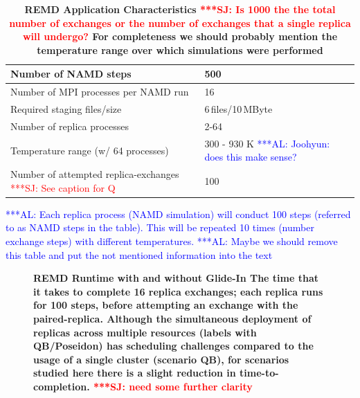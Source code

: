 \documentclass{rspublic}
\newcommand{\alnote}[1]{ {\textcolor{blue} { ***AL: #1 }}}
\newcommand{\jhanote}[1]{ {\textcolor{red} { ***SJ: #1 }}}
\newcommand{\alnote}[1]{}
\newcommand{\jhanote}[1]{}
\newcommand{\glidein}[1]{Glide-In }
\begin{document}
\begin{table}
    \centering
	\begin{tabular}{|p{5cm}|l|}
          \hline
          Number of NAMD steps &500\\ \hline 
          Number of MPI processes per NAMD run &16\\ \hline 
          Required staging files/size &6\,files/10\,MByte\\ \hline
          Number of replica processes &2-64 \\ \hline   
          Temperature range (w/ 64 processes) &300 - 930 K \alnote{Joohyun: does this make sense?} \\ \hline
          Number of attempted replica-exchanges \jhanote{See caption for Q} &100\\ \hline
	\end{tabular}
	\caption{\footnotesize \bf REMD Application Characteristics\label{tab:app_stats}
          \jhanote{Is 1000 the the total number of exchanges or the
            number of exchanges that a single replica will undergo?}
          For completeness we should probably mention the temperature
          range over which simulations were performed}
          \alnote{Each replica process (NAMD simulation) will conduct 
          100 steps (referred to as NAMD steps in the table). This 
          will be repeated 10 times (number exchange steps) with 
          different temperatures.}         
          \alnote{Maybe we should remove this table and put the not mentioned information 
          into the text}
          
\end{table}  
 
\begin{figure}[ht]
    \centering
    \hspace*{-20pt}
        \caption{\footnotesize \bf REMD Runtime with and without \glidein: 
         The time that it takes to complete 16 replica exchanges; 
each replica runs for 100 steps, before attempting an exchange with
the paired-replica. Although the simultaneous deployment of
          replicas across multiple resources (labels with QB/Poseidon)
          has scheduling challenges compared to the usage of a single
          cluster (scenario QB), for scenarios studied here there is a
          slight reduction in time-to-completion.
          \jhanote{need some further clarity} }
    \label{fig:performance_perf_runtime}
\end{figure}     
\end{document}
